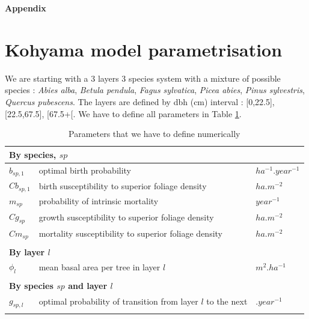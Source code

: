\documentclass{article}
\begin{document}
\clearpage

\printbibliography

\clearpage


\begin{center}
    \textbf{\Large Appendix}
\end{center}

\appendix

\section{Kohyama model parametrisation}

We are starting with a 3 layers 3 species system with a mixture of possible species : \textit{Abies alba}, \textit{Betula pendula}, \textit{Fagus sylvatica}, \textit{Picea abies}, \textit{Pinus sylvestris}, \textit{Quercus pubescens}. The layers are defined by dbh (cm) interval : [0,22.5], [22.5,67.5], [67.5+[. We have to define all parameters in Table \ref{tab:coeftoparam}.

\begin{table}[H]
    \centering
    \begin{tabular}{l l l}
    \hline
    \hline
    \multicolumn{3}{l}{\textbf{By species}, $sp$} \\
    \hline
    $b_{sp,1}$     & optimal birth probability                              & $ha^{-1}.year^{-1}$ \\
    $Cb_{sp,1}$    & birth susceptibility to superior foliage density       & $ha.m^{-2}$       \\
    $m_{sp}$       & probability of intrinsic mortality                     & $year^{-1}$ \\
    $Cg_{sp}$      & growth susceptibility to superior foliage density      & $ha.m^{-2}$           \\
    $Cm_{sp}$      & mortality susceptibility to superior foliage density   & $ha.m^{-2}$           \\    
    \\
    \multicolumn{3}{l}{\textbf{By layer $l$}} \\
    \hline
    $\phi_{l}$  & mean basal area per tree in layer $l$        & $m^{2}.ha^{-1}$  \\
    \\
    \multicolumn{3}{l}{\textbf{By species $sp$ and layer $l$}} \\
    \hline
    $g_{sp,l}$     & optimal probability of transition from layer $l$ to the next & $.year^{-1}$ \\
    \\
    \hline
    \hline
    \end{tabular}
    \caption{Parameters that we have to define numerically}
    \label{tab:coeftoparam} 
\end{table}
\end{document}
